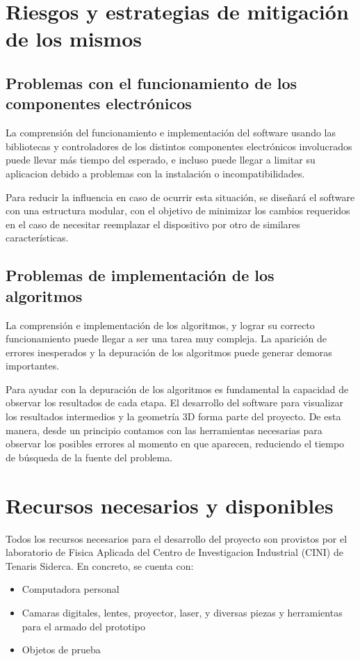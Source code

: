\section{Riesgos y estrategias de mitigación de los mismos}
\subsection{Problemas con el funcionamiento de los componentes electrónicos}
La comprensión del funcionamiento e implementación del software usando las bibliotecas y controladores de los distintos componentes electrónicos involucrados puede llevar más tiempo del esperado, e incluso puede llegar a limitar su aplicacion debido a problemas con la instalación o incompatibilidades.

Para reducir la influencia en caso de ocurrir esta situación, se diseñará el software con una estructura modular, con el objetivo de minimizar los cambios requeridos en el caso de necesitar reemplazar el dispositivo por otro de similares características.

\subsection{Problemas de implementación de los algoritmos}
La comprensión e implementación de los algoritmos, y lograr su correcto funcionamiento puede llegar a ser una tarea muy compleja. La aparición de errores inesperados y la depuración de los algoritmos puede generar demoras importantes.

Para ayudar con la depuración de los algoritmos es fundamental la capacidad de observar los resultados de cada etapa. El desarrollo del software para visualizar los resultados intermedios y la geometría 3D forma parte del proyecto. De esta manera, desde un principio contamos con las herramientas necesarias para observar los posibles errores al momento en que aparecen, reduciendo el tiempo de búsqueda de la fuente del problema.

\section{Recursos necesarios y disponibles}
Todos los recursos necesarios para el desarrollo del proyecto son provistos por el laboratorio de Fisica Aplicada del Centro de Investigacion Industrial (CINI) de Tenaris Siderca. En concreto, se cuenta con:
\begin{itemize}
\item Computadora personal
\item Camaras digitales, lentes, proyector, laser, y diversas piezas y herramientas para el armado del prototipo
\item Objetos de prueba
\end{itemize}

